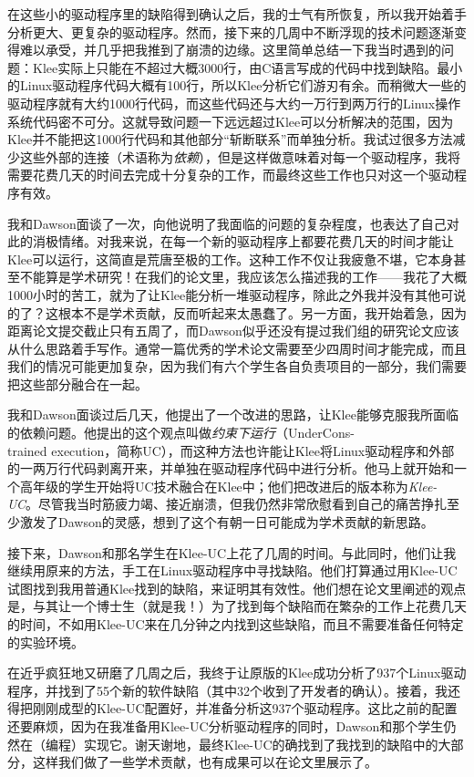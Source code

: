 \documentclass[letter,12pt]{book}
\begin{document}
\begin{CJK}{UTF8}{gbsn}
在这些小的驱动程序里的缺陷得到确认之后，我的士气有所恢复，所以我开始着手分析更大、更复杂的驱动程序。然而，接下来的几周中不断浮现的技术问题逐渐变得难以承受，并几乎把我推到了崩溃的边缘。这里简单总结一下我当时遇到的问题：Klee实际上只能在不超过大概3000行，由C语言写成的代码中找到缺陷。最小的Linux驱动程序代码大概有100行，所以Klee分析它们游刃有余。而稍微大一些的驱动程序就有大约1000行代码，而这些代码还与大约一万行到两万行的Linux操作系统代码密不可分。这就导致问题一下远远超过Klee可以分析解决的范围，因为Klee并不能把这1000行代码和其他部分“斩断联系”而单独分析。我试过很多方法减少这些外部的连接（术语称为\emph{依赖}），但是这样做意味着对每一个驱动程序，我将需要花费几天的时间去完成十分复杂的工作，而最终这些工作也只对这一个驱动程序有效。

我和Dawson面谈了一次，向他说明了我面临的问题的复杂程度，也表达了自己对此的消极情绪。对我来说，在每一个新的驱动程序上都要花费几天的时间才能让Klee可以运行，这简直是荒唐至极的工作。这种工作不仅让我疲惫不堪，它本身甚至不能算是学术研究！在我们的论文里，我应该怎么描述我的工作——我花了大概1000小时的苦工，就为了让Klee能分析一堆驱动程序，除此之外我并没有其他可说的了？这根本不是学术贡献，反而听起来太愚蠢了。另一方面，我开始着急，因为距离论文提交截止只有五周了，而Dawson似乎还没有提过我们组的研究论文应该从什么思路着手写作。通常一篇优秀的学术论文需要至少四周时间才能完成，而且我们的情况可能更加复杂，因为我们有六个学生各自负责项目的一部分，我们需要把这些部分融合在一起。

我和Dawson面谈过后几天，他提出了一个改进的思路，让Klee能够克服我所面临的依赖问题。他提出的这个观点叫做\emph{约束下运行}（UnderCons-\\trained execution，简称UC），而这种方法也许能让Klee将Linux驱动程序和外部的一两万行代码剥离开来，并单独在驱动程序代码中进行分析。他马上就开始和一个高年级的学生开始将UC技术融合在Klee中；他们把改进后的版本称为\emph{Klee-UC}。尽管我当时筋疲力竭、接近崩溃，但我仍然非常欣慰看到自己的痛苦挣扎至少激发了Dawson的灵感，想到了这个有朝一日可能成为学术贡献的新思路。

接下来，Dawson和那名学生在Klee-UC上花了几周的时间。与此同时，他们让我继续用原来的方法，手工在Linux驱动程序中寻找缺陷。他们打算通过用Klee-UC试图找到我用普通Klee找到的缺陷，来证明其有效性。他们想在论文里阐述的观点是，与其让一个博士生（就是我！）为了找到每个缺陷而在繁杂的工作上花费几天的时间，不如用Klee-UC来在几分钟之内找到这些缺陷，而且不需要准备任何特定的实验环境。

在近乎疯狂地又研磨了几周之后，我终于让原版的Klee成功分析了937个Linux驱动程序，并找到了55个新的软件缺陷（其中32个收到了开发者的确认）。接着，我还得把刚刚成型的Klee-UC配置好，并准备分析这937个驱动程序。这比之前的配置还要麻烦，因为在我准备用Klee-UC分析驱动程序的同时，Dawson和那个学生仍然在（编程）实现它。谢天谢地，最终Klee-UC的确找到了我找到的缺陷中的大部分，这样我们做了一些学术贡献，也有成果可以在论文里展示了。


\end{CJK}
\end{document}
